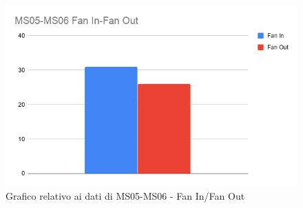 \begin{figure}[H]
\centering
\includegraphics[scale=0.45]{./img/MS05-MS06.png}
\caption{Grafico relativo ai dati di MS05-MS06 - Fan In/Fan Out}
\end{figure}




